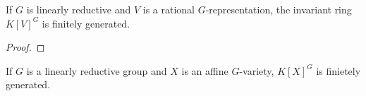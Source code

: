 \begin{corollary}[2.2.8]
  
\end{corollary}

\begin{corollary}[2.2.9]

\end{corollary}

\begin{theorem}
  If $G$ is linearly reductive and $V$ is a rational $G$-representation, the invariant ring $K[V]^G$ is finitely generated.
\end{theorem}

\begin{proof}
  
\end{proof}

\begin{corollary}
  If $G$ is a linearly reductive group and $X$ is an affine $G$-variety, $K[X]^G$ is finietely generated.
\end{corollary}

